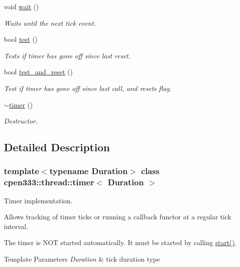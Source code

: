 \begin{DoxyCompactItemize}
void \hyperlink{classcpen333_1_1thread_1_1timer_aecbb193d8d58a41488881fd795aac9e1}{wait} ()
\begin{DoxyCompactList}\small\item\em Waits until the next tick event. \end{DoxyCompactList}\item 
bool \hyperlink{classcpen333_1_1thread_1_1timer_af81a4656b66d8bebd7497ffe826f4373}{test} ()
\begin{DoxyCompactList}\small\item\em Tests if timer has gone off since last reset. \end{DoxyCompactList}\item 
bool \hyperlink{classcpen333_1_1thread_1_1timer_a6fc134f093e0ff35ef1baebefd62ed8b}{test\+\_\+and\+\_\+reset} ()
\begin{DoxyCompactList}\small\item\em Test if timer has gone off since last call, and resets flag. \end{DoxyCompactList}\item 
\hyperlink{classcpen333_1_1thread_1_1timer_a4c25e491b57438c7a60fe54b45b369b8}{$\sim$timer} ()
\begin{DoxyCompactList}\small\item\em Destructor. \end{DoxyCompactList}\end{DoxyCompactItemize}


\subsection{Detailed Description}
\subsubsection*{template$<$typename Duration$>$\newline
class cpen333\+::thread\+::timer$<$ Duration $>$}

Timer implementation. 

Allows tracking of timer ticks or running a callback functor at a regular tick interval.

The timer is N\+OT started automatically. It must be started by calling \hyperlink{classcpen333_1_1thread_1_1timer_a0d1be90402f46912966ec5fc13707bce}{start()}.


\begin{DoxyTemplParams}{Template Parameters}
{\em Duration} & tick duration type \\
\hline
\end{DoxyTemplParams}


